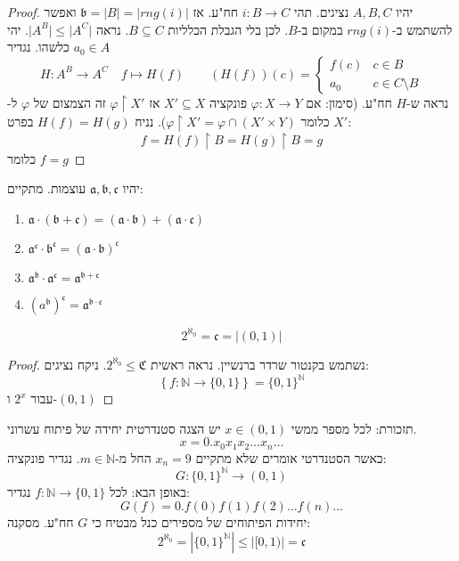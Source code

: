 \documentclass{tstextbook}
\begin{document}
\begin{proof}
יהיו \(A,B,C\) נציגים. תהי \(i: B\to C\) חח"ע. אז \(\mathfrak{b}=|B|=|rng(i)|\) ואפשר להשתמש ב-\(rng(i)\) במקום ב-\(B\). לכן בלי הגבלת הכלליות \(B\subseteq C\). נראה \(\lvert A^B \rvert\leq \lvert A^C \rvert\). יהי \(a_{0} \in A\) כלשהו. נגדיר 
$$H:A^B\to A^C\quad f\mapsto H(f)\qquad (H(f))(c)=\begin{cases}f(c) & c\in B \\a_{0} &  c \in C \setminus  B
\end{cases}$$
נראה ש-\(H\) חח"ע. (סימון: אם \(\varphi:X\to Y\) פונקציה \(X'\subseteq X\) אז \(\varphi\upharpoonright X'\) זה הצמצום של \(\varphi\) ל-\(X'\) כלומר \(\varphi \upharpoonright X'= \varphi \cap (X' \times Y)\)). נניח \(H(f)=H(g)\) בפרט:
$$f=H(f)\upharpoonright B=H(g)\upharpoonright B = g$$
כלומר \(f=g\)

\end{proof}
יהיו \(\mathfrak{a,b,c}\) עוצמות. מתקיים:

\begin{enumerate}
  \item \({\mathfrak{a}}\cdot({\mathfrak{b}}+{\mathfrak{c}})=({\mathfrak{a}}\cdot{\mathfrak{b}})+({\mathfrak{a}}\cdot{\mathfrak{c}})\)


  \item \({\mathfrak{a}}^{\mathfrak{c}}\cdot{\mathfrak{b}}^{\mathfrak{c}}=({\mathfrak{a}}\cdot{\mathfrak{b}})^{\mathfrak{c}}\)


  \item \({\mathfrak{a}}^{\mathfrak{b}}\cdot{\mathfrak{a}}^{\mathfrak{c}}={\mathfrak{a}}^{\mathfrak{b}+{\mathfrak{c}}}\)


  \item \(\left(a^{\mathfrak{b}}\right)^{\mathfrak{c}}={\mathfrak{a}}^{{\mathfrak{b}}\cdot{\mathfrak{c}}}\)


\end{enumerate}
\begin{proposition}
$$2^{\aleph_{0}}=\mathfrak{c} = |(0,1)|$$

\end{proposition}
\begin{proof}
נשתמש בקנטור שרדר ברנשיין. נראה ראשית \(2^{\aleph_{0}}\leq \mathfrak{C}\). ניקח נציגים:
$$\left\{  f:\mathbb{N}\to \{ 0,1 \}  \right\}=\{ 0,1 \}^\mathbb{N}$$
עבור \(2^x\) ו-\((0,1)\)

\end{proof}
תזכורת:
לכל מספר ממשי \(x \in (0,1)\) יש הצגה סטנדרטית יחידה של פיתוח עשרוני.
$$x=0.x_{0}x_{1}x_{2}\dots x_{n}\dots$$
כאשר הסטנדרטי אומרים שלא מתקיים \(x_{n}=9\) החל מ-\(m \in \mathbb{N}\).
נגדיר פונקציה:
$$G:\{ 0,1 \}^\mathbb{N}\to (0,1)$$
באופן הבא:
לכל \(f:\mathbb{N}\to \{ 0,1 \}\) נגדיר:
$$G(f)=0.f(0)f(1)f(2)\dots f(n)\dots$$
יחידות הפיתוחים של מספירים כנל מבטיח כי \(G\) חח"ע. מסקנה:
$$2^{\aleph_{0}}=|\{ 0,1 \}^\mathbb{N}|\leq|[0,1)|=\mathfrak{c}  $$
\end{document}
